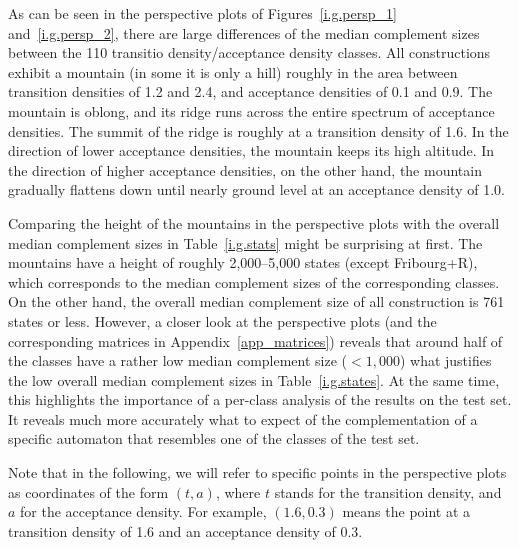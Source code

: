 As can be seen in the perspective plots of Figures~\ref{i.g.persp_1} and~\ref{i.g.persp_2}, there are large differences of the median complement sizes between the 110 transitio density/acceptance density classes. All constructions exhibit a mountain (in some it is only a hill) roughly in the area between transition densities of 1.2 and 2.4, and acceptance densities of 0.1 and 0.9. The mountain is oblong, and its ridge runs across the entire spectrum of acceptance densities. The summit of the ridge is roughly at a transition density of 1.6. In the direction of lower acceptance densities, the mountain keeps its high altitude. In the direction of higher acceptance densities, on the other hand, the mountain gradually flattens down until nearly ground level at an acceptance density of 1.0.

Comparing the height of the mountains in the perspective plots with the overall median complement sizes in Table~\ref{i.g.stats} might be surprising at first. The mountains have a height of roughly 2,000--5,000 states (except Fribourg+R), which corresponds to the median complement sizes of the corresponding classes. On the other hand, the overall median complement size of all construction is 761 states or less. However, a closer look at the perspective plots (and the corresponding matrices in Appendix~\ref{app_matrices}) reveals that around half of the classes have a rather low median complement size ($< 1,000$) what justifies the low overall median complement sizes in Table~\ref{i.g.states}. At the same time, this highlights the importance of a per-class analysis of the results on the \goal{} test set. It reveals much more accurately what to expect of the complementation of a specific automaton that resembles one of the classes of the \goal{} test set.


Note that in the following, we will refer to specific points in the perspective plots as coordinates of the form $(t,a)$, where $t$ stands for the transition density, and $a$ for the acceptance density. For example, $(1.6,0.3)$ means the point at a transition density of 1.6 and an acceptance density of 0.3.


